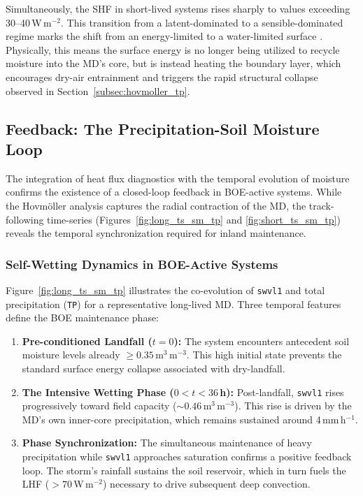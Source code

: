 Simultaneously, the SHF in short-lived systems rises sharply to
values exceeding 30--40\,W\,m$^{-2}$. This transition from a
latent-dominated to a sensible-dominated regime marks the shift from
an energy-limited to a water-limited surface
\citep{seneviratne2010investigating}. Physically, this means the
surface energy is no longer being utilized to recycle moisture into
the MD's core, but is instead heating the boundary layer, which
encourages dry-air entrainment and triggers the rapid structural
collapse observed in Section~\ref{subsec:hovmoller_tp}.

\subsection{Feedback: The Precipitation-Soil Moisture Loop}
\label{subsec:ts_sm_tp}

The integration of heat flux diagnostics with the temporal evolution
of moisture confirms the existence of a closed-loop feedback in
BOE-active systems. While the Hovm\"{o}ller analysis captures the
radial contraction of the MD, the track-following time-series
(Figures~\ref{fig:long_ts_sm_tp} and \ref{fig:short_ts_sm_tp})
reveals the temporal synchronization required for inland maintenance.

\subsubsection*{Self-Wetting Dynamics in BOE-Active Systems}

Figure~\ref{fig:long_ts_sm_tp} illustrates the co-evolution of
\texttt{swvl1} and total precipitation (\texttt{TP}) for a
representative long-lived MD. Three temporal features define the BOE
maintenance phase:
\begin{enumerate}
  \item \textbf{Pre-conditioned Landfall ($t=0$):} The system
    encounters antecedent soil moisture levels already $\geq
    0.35$\,m$^3$\,m$^{-3}$. This high initial state prevents the
    standard surface energy collapse associated with dry-landfall.
  \item \textbf{The Intensive Wetting Phase ($0 < t < 36$\,h):}
    Post-landfall, \texttt{swvl1} rises progressively toward field
    capacity ($\sim 0.46$\,m$^3$\,m$^{-3}$). This rise is driven by
    the MD's own inner-core precipitation, which remains sustained
    around 4\,mm\,h$^{-1}$.
  \item \textbf{Phase Synchronization:} The simultaneous maintenance
    of heavy precipitation while \texttt{swvl1} approaches saturation
    confirms a positive feedback loop. The storm's rainfall sustains
    the soil reservoir, which in turn fuels the LHF
    ($>70$\,W\,m$^{-2}$) necessary to drive subsequent deep convection.
\end{enumerate}

